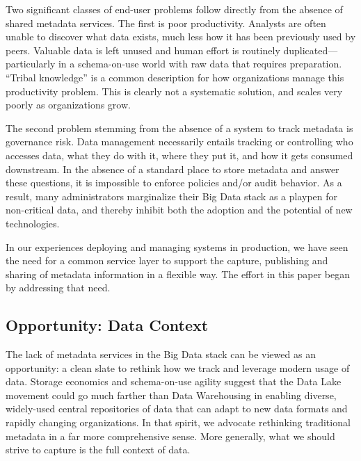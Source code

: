 \documentclass{sig-alternate}
\begin{document}
Two significant classes of end-user problems follow directly from the absence of shared metadata services.
The first is poor productivity.
Analysts are often unable to discover what data exists, much less how it has been previously used by peers. 
Valuable data is left unused
and human effort is routinely duplicated---particularly in a schema-on-use world with raw data that requires preparation.  
``Tribal knowledge'' is a common description for how organizations manage this productivity problem. 
This is clearly not a systematic solution, and scales very poorly as organizations grow.

The second problem 
stemming from the absence of a system to track metadata 
is governance risk. 
Data management necessarily entails tracking or controlling who accesses data, what they do with it, where they put it, and how it gets consumed downstream. 
In the absence of a standard place to store metadata and answer these questions, it is impossible to enforce policies and/or audit behavior. 
As a result, many administrators marginalize their Big Data stack as a playpen for non-critical data, and thereby inhibit both the adoption and the potential of new technologies.


In our experiences deploying and managing systems in production, we 
have seen the need for a common service layer to support the capture, publishing and sharing of metadata information in a flexible way. 
The effort in this paper began by addressing that need.

\subsection{Opportunity: Data Context}
The lack of metadata services in the Big Data stack can be viewed as an opportunity:
a clean slate to rethink how we track and leverage modern usage of data.
Storage economics and schema-on-use agility suggest that the Data Lake movement could go much farther than Data Warehousing in enabling diverse, widely-used central repositories of data that can adapt to new data formats and rapidly changing organizations.
In that spirit, we advocate rethinking traditional metadata in a far more comprehensive sense. 
More generally, what we should strive to capture is the full context of data.
\end{document}
